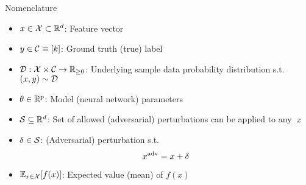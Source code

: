 \begin{frame}{Nomenclature}
    

  \begin{itemize}[<+->]
    \setlength{\itemsep}{6pt}
  \item ${x \in \mathcal{X} \subset \mathbb{R}^d}$: Feature vector
    \item ${y \in \mathcal{C} \equiv {\lbrack k\rbrack}}$: Ground truth (true) label
    \item ${\mathcal{D}:\mathcal{X} \times \mathcal{C}\rightarrow\mathbb{R}_{{\geq}0}}$: Underlying sample data probability distribution s.t.\ ${(x,y) \sim \mathcal{D}}$

    \vspace{6pt}
    \item ${\theta \in \mathbb{R}^{p}}$: Model (neural network) parameters

    \vspace{6pt}
  \item ${\mathcal{S} \subseteq \mathbb{R}^{d}}$: Set of allowed (adversarial) perturbations can be applied to any~$x$
    \item ${\delta \in \mathcal{S}}$: (Adversarial) perturbation s.t.
      \begin{equation}\label{eq:AdversarialX}
        x^{\text{adv}} = x + \delta
      \end{equation}

    \vspace{6pt}
    \item $\mathbb{E}_{x \in \mathcal{X}}\lbrack f(x)\rbrack$: Expected value (mean) of $f(x)$
  \end{itemize}
\end{frame}


